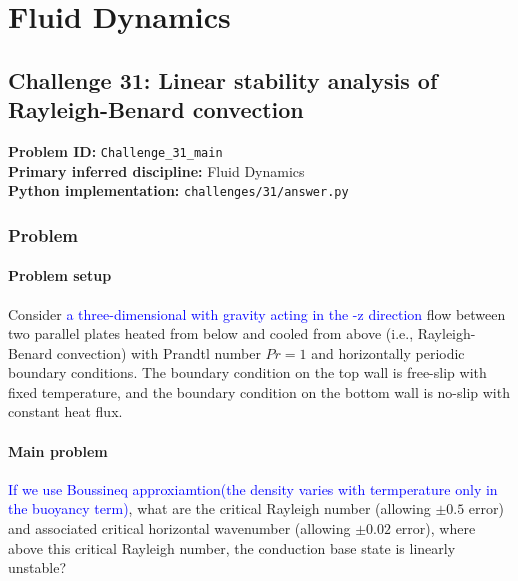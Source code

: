 \section{Fluid Dynamics}
\subsection[Challenge 31: Linear stability analysis of Rayleigh-Benard convection]{Challenge 31: Linear stability analysis of Rayleigh-Benard convection}
\textbf{Problem ID:} \texttt{Challenge\_31\_main}\\
\textbf{Primary inferred discipline:} Fluid Dynamics\\
\textbf{Python implementation:} \texttt{challenges/31/answer.py}

\subsubsection*{Problem}
\paragraph*{Problem setup}
Consider \textcolor{blue}{a three-dimensional with gravity acting in the -z direction} flow between two parallel plates heated from below and cooled from above (i.e., Rayleigh-Benard convection) with Prandtl number $Pr=1$ and horizontally periodic boundary conditions. The boundary condition on the top wall is free-slip with fixed temperature, and the boundary condition on the bottom wall is no-slip with constant heat flux.


\paragraph*{Main problem}
\textcolor{blue}{If we use Boussineq approxiamtion(the density varies with termperature only in the buoyancy term)}, what are the critical Rayleigh number (allowing $\pm 0.5$ error) and associated critical horizontal wavenumber (allowing $\pm 0.02$ error), where above this critical Rayleigh number, the conduction base state is linearly unstable?
